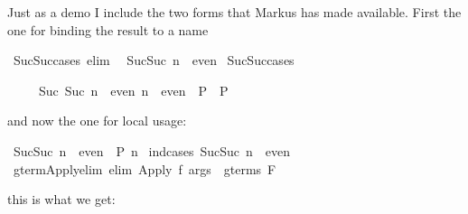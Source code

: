 \begin{isabellebody}
\begin{isamarkuptext}
Just as a demo I include
the two forms that Markus has made available. First the one for binding the
result to a name%
\end{isamarkuptext}%
\ Suc{\isacharunderscore}Suc{\isacharunderscore}cases\ {\isacharbrackleft}elim{\isacharbang}{\isacharbrackright}{\isacharcolon}\isanewline
\ \ {\isachardoublequote}Suc{\isacharparenleft}Suc\ n{\isacharparenright}\ {\isasymin}\ even{\isachardoublequote}\isanewline
\isanewline
{}\ Suc{\isacharunderscore}Suc{\isacharunderscore}cases%
\begin{isamarkuptext}%
\begin{isabelle}%
\ \ \ \ \ {\isasymlbrakk}Suc\ {\isacharparenleft}Suc\ n{\isacharparenright}\ {\isasymin}\ even{\isacharsemicolon}\ n\ {\isasymin}\ even\ {\isasymLongrightarrow}\ P{\isasymrbrakk}\ {\isasymLongrightarrow}\ P%
\end{isabelle}

and now the one for local usage:%
\end{isamarkuptext}%
\ {\isachardoublequote}Suc{\isacharparenleft}Suc\ n{\isacharparenright}\ {\isasymin}\ even\ {\isasymLongrightarrow}\ P\ n{\isachardoublequote}\isanewline
{}\ {\isacharparenleft}ind{\isacharunderscore}cases\ {\isachardoublequote}Suc{\isacharparenleft}Suc\ n{\isacharparenright}\ {\isasymin}\ even{\isachardoublequote}{\isacharparenright}\isanewline
{}\isanewline
\isanewline
{}\ gterm{\isacharunderscore}Apply{\isacharunderscore}elim\ {\isacharbrackleft}elim{\isacharbang}{\isacharbrackright}{\isacharcolon}\ {\isachardoublequote}Apply\ f\ args\ {\isasymin}\ gterms\ F{\isachardoublequote}%
\begin{isamarkuptext}%
this is what we get:


\end{isamarkuptext}
\end{isabellebody}
